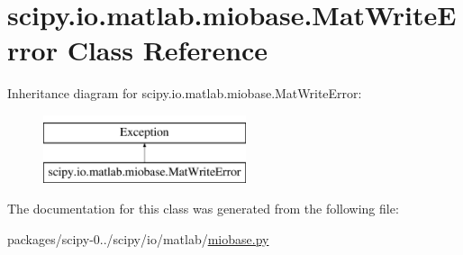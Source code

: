 \hypertarget{classscipy_1_1io_1_1matlab_1_1miobase_1_1MatWriteError}{}\section{scipy.\+io.\+matlab.\+miobase.\+Mat\+Write\+Error Class Reference}
\label{classscipy_1_1io_1_1matlab_1_1miobase_1_1MatWriteError}
Inheritance diagram for scipy.\+io.\+matlab.\+miobase.\+Mat\+Write\+Error\+:\begin{figure}[H]
\begin{center}
\leavevmode
\includegraphics[height=2.000000cm]{classscipy_1_1io_1_1matlab_1_1miobase_1_1MatWriteError}
\end{center}
\end{figure}


The documentation for this class was generated from the following file\+:\begin{DoxyCompactItemize}
\item 
packages/scipy-\/0../scipy/io/matlab/\hyperlink{miobase_8py}{miobase.\+py}\end{DoxyCompactItemize}
